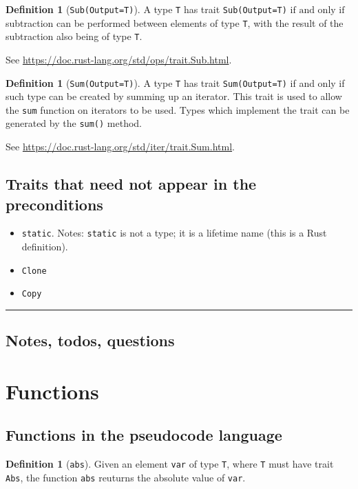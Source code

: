 \documentclass[11pt,a4paper]{article}
\theoremstyle{definition}
\newtheorem{definition}[theorem]{Definition}
\newcommand{\horizline}{\noindent\rule{\textwidth}{1pt}}
\newcommand{\inRust}[2]{See \url{#2}.}
\newcommand{\iffText}{\text{if and only if}}
\begin{document}
\begin{definition}[\texttt{Sub(Output=T)}]
\label{defn:trait-sub}
    A type \texttt{T} has trait \texttt{Sub(Output=T)} $\iffText$ subtraction can be performed between elements of type \texttt{T}, with the result of the subtraction also being of type \texttt{T}.
    
    \inRust{Trait std::ops::Sub}{https://doc.rust-lang.org/std/ops/trait.Sub.html}
\end{definition}

\begin{definition}[\texttt{Sum(Output=T)}]
    A type \texttt{T} has trait \texttt{Sum(Output=T)} if and only if such type can be created by summing up an iterator. This trait is used to allow the \texttt{sum} function on iterators to be used. Types which implement the trait can be generated by the \texttt{sum()} method.
    
    \inRust{Trait std::iter::Sum}{https://doc.rust-lang.org/std/iter/trait.Sum.html}
\end{definition}

\subsection{Traits that need not appear in the preconditions}
\begin{itemize}
    \item \texttt{\textquotesingle static}. Notes: \texttt{\textquotesingle static} is not a type; it is a lifetime name (this is a Rust definition).
    \item \texttt{Clone}
    \item \texttt{Copy}
\end{itemize}

\horizline

\subsection{Notes, todos, questions}

\section{Functions}

\subsection{Functions in the pseudocode language}

\begin{definition}[\texttt{abs}]
    Given an element \texttt{var} of type \texttt{T}, where \texttt{T} must have trait \texttt{Abs}, the function \texttt{abs} reuturns the absolute value of \texttt{var}.
\end{definition}
\end{document}

